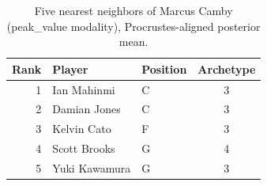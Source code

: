 \begin{table}[htbp]
  \centering\small
  \begin{tabular}{rllc}
    \toprule
    Rank & Player & Position & Archetype \\
    \midrule
    1 & Ian Mahinmi & C & 3 \\
    2 & Damian Jones & C & 3 \\
    3 & Kelvin Cato & F & 3 \\
    4 & Scott Brooks & G & 4 \\
    5 & Yuki Kawamura & G & 3 \\
    \bottomrule
  \end{tabular}
  \caption{Five nearest neighbors of Marcus Camby (peak_value modality), Procrustes-aligned posterior mean.}
  \label{tab:Marcus_Camby_neighbors_peak_value}
\end{table}

